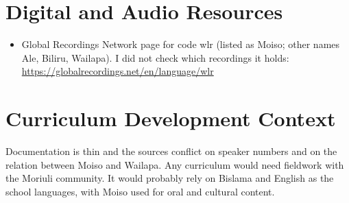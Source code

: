 \documentclass[12pt]{article}
\begin{document}
\section{Digital and Audio Resources}
\begin{itemize}
\item Global Recordings Network page for code wlr (listed as Moiso; other names Ale, Biliru, Wailapa). I did not check which recordings it holds: \url{https://globalrecordings.net/en/language/wlr}
\end{itemize}

\section{Curriculum Development Context}
Documentation is thin and the sources conflict on speaker numbers and on the relation between Moiso and Wailapa. Any curriculum would need fieldwork with the Moriuli community. It would probably rely on Bislama and English as the school languages, with Moiso used for oral and cultural content.
\end{document}
